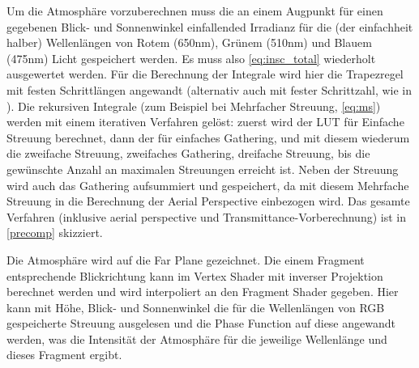 Um die Atmosphäre vorzuberechnen muss die an einem Augpunkt für einen gegebenen Blick- und Sonnenwinkel einfallended
Irradianz für die (der einfachheit halber) Wellenlängen von Rotem (650nm), Grünem (510nm) und Blauem (475nm) Licht
gespeichert werden. Es muss also \cref{eq:insc_total} wiederholt ausgewertet werden. Für die Berechnung der Integrale
wird hier die Trapezregel mit festen Schrittlängen angewandt (alternativ auch mit fester Schrittzahl, wie in
\cite{Bodare14}). Die rekursiven Integrale (zum Beispiel bei Mehrfacher Streuung, \cref{eq:ms}) werden mit einem
iterativen Verfahren gelöst: zuerst wird der LUT für Einfache Streuung berechnet, dann der für einfaches Gathering, und
mit diesem wiederum die zweifache Streuung, zweifaches Gathering, dreifache Streuung, bis die gewünschte Anzahl an
maximalen Streuungen erreicht ist. Neben der Streuung wird auch das Gathering aufsummiert und gespeichert, da mit diesem
Mehrfache Streuung in die Berechnung der Aerial Perspective einbezogen wird. Das gesamte Verfahren (inklusive aerial
perspective und Transmittance-Vorberechnung) ist in \cref{precomp} skizziert.

Die Atmosphäre wird auf die Far Plane gezeichnet. Die einem Fragment entsprechende Blickrichtung kann im Vertex Shader
mit inverser Projektion berechnet werden und wird interpoliert an den Fragment Shader gegeben. Hier kann mit Höhe,
Blick- und Sonnenwinkel die für die Wellenlängen von RGB gespeicherte Streuung ausgelesen und die Phase Function auf
diese angewandt werden, was die Intensität der Atmosphäre für die jeweilige Wellenlänge und dieses Fragment ergibt.

